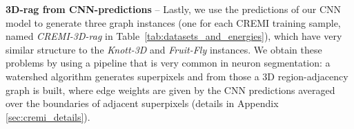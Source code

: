 \textbf{3D-rag from CNN-predictions} -- Lastly, we use the predictions of our CNN model to generate three graph instances (one for each CREMI training sample, named \emph{CREMI-3D-rag} in Table~\ref{tab:datasets_and_energies}), which have very similar structure to the \emph{Knott-3D} and \emph{Fruit-Fly} instances.  We obtain these problems by using a pipeline that is very common in neuron segmentation: a watershed algorithm generates superpixels and from those a 3D region-adjacency graph is built, where edge weights are given by the CNN predictions averaged over the boundaries of adjacent superpixels (details in Appendix \ref{sec:cremi_details}). 






 


